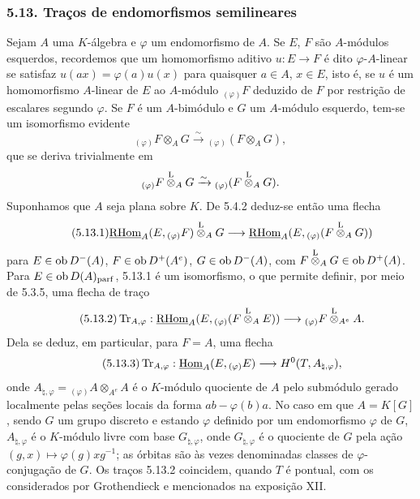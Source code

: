 \subsubsection*{5.13. Traços de endomorfismos semilineares}

Sejam $A$ uma $K$-álgebra e $\varphi$ um endomorfismo de $A$. Se $E$, $F$ são $A$-módulos esquerdos, recordemos que um homomorfismo aditivo $u:E\to F$ é dito $\varphi$-$A$-linear se satisfaz $u(ax)=\varphi(a)u(x)$ para quaisquer $a\in A$, $x\in E$, isto é, se $u$ é um homomorfismo $A$-linear de $E$ ao $A$-módulo ${}_{(\varphi)}F$ deduzido de $F$ por restrição de escalares segundo $\varphi$. Se $F$ é um $A$-bimódulo e $G$ um $A$-módulo esquerdo, tem-se um isomorfismo evidente
\[
{}_{(\varphi)}F\otimes_AG\xrightarrow{\sim}{}_{(\varphi)}(F\otimes_AG),
\]
que se deriva trivialmente em
\[
{}_{(\varphi)}F\overset{\mathrm L}{\otimes}_AG\xrightarrow{\sim}{}_{(\varphi)}(F\overset{\mathrm L}{\otimes}_AG).
\]
Suponhamos que $A$ seja plana sobre $K$. De 5.4.2 deduz-se então uma flecha
\begin{equation}\tag{5.13.1}
\underline{\mathrm{RHom}}_A(E,{}_{(\varphi)}F)\overset{\mathrm L}{\otimes}_AG\longrightarrow\underline{\mathrm{RHom}}_A(E,{}_{(\varphi)}(F\overset{\mathrm L}{\otimes}_AG))
\end{equation}
para $E\in\operatorname{ob} D^-(A)$, $F\in\operatorname{ob} D^+(A^e)$, $G\in\operatorname{ob} D^-(A)$, com $F\overset{\mathrm L}{\otimes}_AG\in\operatorname{ob} D^+(A)$. Para $E\in\operatorname{ob} D(A)_{\mathrm{parf}}$, 5.13.1 é um isomorfismo, o que permite definir, por meio de 5.3.5, uma flecha de traço
\begin{equation}\tag{5.13.2}
\operatorname{Tr}_{A,\varphi}:\underline{\mathrm{RHom}}_A(E,{}_{(\varphi)}(F\overset{\mathrm L}{\otimes}_AE))\longrightarrow {}_{(\varphi)}F\overset{\mathrm L}{\otimes}_{A^e}A.
\end{equation}
Dela se deduz, em particular, para $F=A$, uma flecha
\begin{equation}\tag{5.13.3}
\operatorname{Tr}_{A,\varphi}:\underline{\operatorname{Hom}}_A(E,{}_{(\varphi)}E)\longrightarrow H^0(T,A_{\natural,\varphi}),
\end{equation}
onde $A_{\natural,\varphi}={}_{(\varphi)}A\otimes_{A^e}A$ é o $K$-módulo quociente de $A$ pelo submódulo gerado localmente pelas seções locais da forma $ab-\varphi(b)a$. No caso em que $A=K[G]$, sendo $G$ um grupo discreto e estando $\varphi$ definido por um endomorfismo $\varphi$ de $G$, $A_{\natural,\varphi}$ é o $K$-módulo livre com base $G_{\natural,\varphi}$, onde $G_{\natural,\varphi}$ é o quociente de $G$ pela ação $(g,x)\mapsto\varphi(g)xg^{-1}$; as órbitas são às vezes denominadas classes de $\varphi$-conjugação de $G$. Os traços 5.13.2 coincidem, quando $T$ é pontual, com os considerados por Grothendieck e mencionados na exposição XII.
